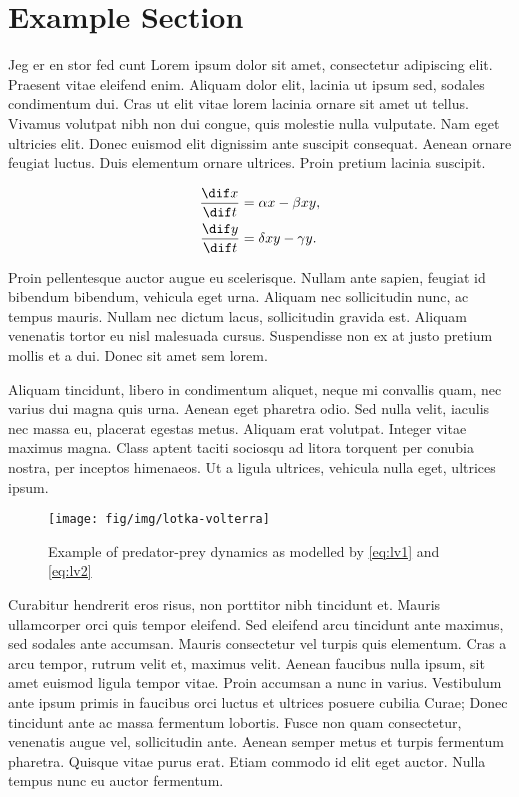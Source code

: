 \section{Example Section}
\label{sec:lvdiffeq}

Jeg er en stor fed cunt
Lorem ipsum dolor sit amet, consectetur adipiscing elit.
Praesent vitae eleifend enim.
Aliquam dolor elit, lacinia ut ipsum sed, sodales condimentum dui.
Cras ut elit vitae lorem lacinia ornare sit amet ut tellus.
Vivamus volutpat nibh non dui congue, quis molestie nulla vulputate.
Nam eget ultricies elit.
Donec euismod elit dignissim ante suscipit consequat.
Aenean ornare feugiat luctus.
Duis elementum ornare ultrices.
Proin pretium lacinia suscipit.

\begin{align}
  \frac{\dif x}{\dif t} &= \alpha x - \beta x y, \label{eq:lv1} \\
  \frac{\dif y}{\dif t} &= \delta xy - \gamma y .\label{eq:lv2}
\end{align}

Proin pellentesque auctor augue eu scelerisque.
Nullam ante sapien, feugiat id bibendum bibendum, vehicula eget urna.
Aliquam nec sollicitudin nunc, ac tempus mauris.
Nullam nec dictum lacus, sollicitudin gravida est.
Aliquam venenatis tortor eu nisl malesuada cursus.
Suspendisse non ex at justo pretium mollis et a dui.
Donec sit amet sem lorem.

Aliquam tincidunt, libero in condimentum aliquet, neque mi convallis quam, nec varius dui magna quis urna.
Aenean eget pharetra odio.
Sed nulla velit, iaculis nec massa eu, placerat egestas metus.
Aliquam erat volutpat.
Integer vitae maximus magna.
Class aptent taciti sociosqu ad litora torquent per conubia nostra, per inceptos himenaeos.
Ut a ligula ultrices, vehicula nulla eget, ultrices ipsum.

\begin{figure}[htbp]
  \centering
  \texttt{[image: fig/img/lotka-volterra]}
  \caption{Example of predator-prey dynamics as modelled by \eqref{eq:lv1} and \eqref{eq:lv2}}
  \label{fig:lvgraph}
\end{figure}

Curabitur hendrerit eros risus, non porttitor nibh tincidunt et.
Mauris ullamcorper orci quis tempor eleifend.
Sed eleifend arcu tincidunt ante maximus, sed sodales ante accumsan.
Mauris consectetur vel turpis quis elementum.
Cras a arcu tempor, rutrum velit et, maximus velit.
Aenean faucibus nulla ipsum, sit amet euismod ligula tempor vitae.
Proin accumsan a nunc in varius.
Vestibulum ante ipsum primis in faucibus orci luctus et ultrices posuere cubilia Curae; Donec tincidunt ante ac massa fermentum lobortis.
Fusce non quam consectetur, venenatis augue vel, sollicitudin ante.
Aenean semper metus et turpis fermentum pharetra.
Quisque vitae purus erat.
Etiam commodo id elit eget auctor.
Nulla tempus nunc eu auctor fermentum.
